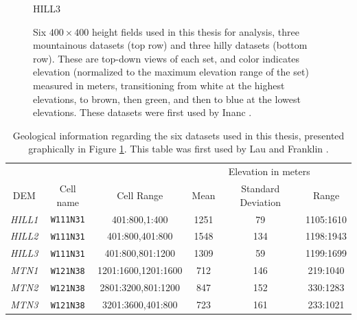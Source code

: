 \begin{figure}[t]
\begin{minipage}[b]{0.3\linewidth}
\begin{center}
HILL3
\end{center}
\end{minipage}
%
\caption[Six height field datasets used for analysis]{\label{figure:SixDatasets} Six $400 \times 400$ height fields used in this thesis for analysis, three mountainous datasets (top row) and three hilly datasets (bottom row). These are top-down views of each set, and color indicates elevation (normalized to the maximum elevation range of the set) measured in meters, transitioning from white at the highest elevations, to brown, then green, and then to blue at the lowest elevations. These datasets were first used by Inanc \cite{inanc-phd}.}
\end{figure}

\begin{table}
\centering
\caption[Geological information regarding six datasets.]{\label{table:SixDatasetsInformation}Geological information regarding the six datasets used in this thesis, presented graphically in Figure \ref{figure:SixDatasets}. This table was first used by Lau and Franklin \cite{Lau-CAGIS}. }
\small{
\begin{tabular}{|c|c c|c c c|}
\hline
               &                  &                     & \multicolumn{3}{c}{Elevation in meters}      \\
DEM 		   & Cell name        & Cell Range          & Mean            & Standard Deviation & Range \\ \hline
\textit{HILL1} & \texttt{W111N31} & 401:800,1:400       & 1251            & 79                 & 1105:1610 \\
\textit{HILL2} & \texttt{W111N31} & 401:800,401:800     & 1548            & 134                & 1198:1943 \\
\textit{HILL3} & \texttt{W111N31} & 401:800,801:1200    & 1309            & 59                 & 1199:1699 \\
\textit{MTN1}  & \texttt{W121N38} & 1201:1600,1201:1600 & 712             & 146                & 219:1040 \\
\textit{MTN2}  & \texttt{W121N38} & 2801:3200,801:1200  & 847             & 152                & 330:1283 \\
\textit{MTN3}  & \texttt{W121N38} & 3201:3600,401:800   & 723             & 161                & 233:1021 \\
\hline
\end{tabular}
}
\end{table}



